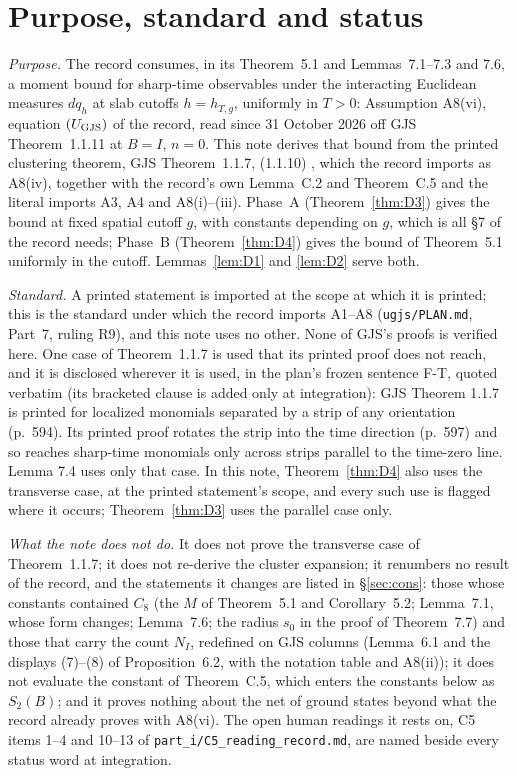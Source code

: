 \section{Purpose, standard and status}\label{sec:purpose}

\emph{Purpose.} The record \cite{R} consumes, in its Theorem~5.1 and Lemmas~7.1--7.3 and 7.6,
a moment bound for sharp-time observables under the interacting Euclidean measures $dq_h$ at
slab cutoffs $h=h_{T,g}$, uniformly in $T>0$: Assumption A8(vi), equation $(U_{\rm GJS})$ of the
record, read since 31 October 2026 off GJS Theorem~1.1.11 at $B=I$, $n=0$. This note derives
that bound from the printed clustering theorem, GJS Theorem~1.1.7, (1.1.10)
\cite[p.~594]{GJS}, which the record imports as A8(iv), together with the record's own
Lemma~C.2 and Theorem~C.5 and the literal imports A3, A4 and A8(i)--(iii). Phase~A
(Theorem~\ref{thm:D3}) gives the bound at fixed spatial cutoff $g$, with constants depending on
$g$, which is all \S7 of the record needs; Phase~B (Theorem~\ref{thm:D4}) gives the bound of
Theorem~5.1 uniformly in the cutoff. Lemmas~\ref{lem:D1} and \ref{lem:D2} serve both.

\emph{Standard.} A printed statement is imported at the scope at which it is printed; this is
the standard under which the record imports A1--A8 (\texttt{ugjs/PLAN.md}, Part~7, ruling R9),
and this note uses no other. None of GJS's proofs is verified here. One case of
Theorem~1.1.7 is used that its printed proof does not reach, and it is disclosed wherever it
is used, in the plan's frozen sentence F-T, quoted verbatim (its bracketed clause is added only at
integration): GJS Theorem 1.1.7 is printed for localized monomials separated by a strip of any
orientation (p.~594). Its printed proof rotates the strip into the time direction (p.~597) and
so reaches sharp-time monomials only across strips parallel to the time-zero line. Lemma 7.4
uses only that case. In this note, Theorem~\ref{thm:D4} also uses the transverse case, at the
printed statement's scope, and every such use is flagged where it occurs;
Theorem~\ref{thm:D3} uses the parallel case only.

\emph{What the note does not do.} It does not prove the transverse case of Theorem~1.1.7; it
does not re-derive the cluster expansion; it renumbers no result of the record, and the
statements it changes are listed in \S\ref{sec:cons}: those whose constants contained $C_8$
(the $M$ of Theorem~5.1 and Corollary~5.2; Lemma~7.1, whose form changes; Lemma~7.6; the
radius $s_0$ in the proof of Theorem~7.7) and those that carry the count $N_I$, redefined on
GJS columns (Lemma~6.1 and the displays (7)--(8) of Proposition~6.2, with the notation table
and A8(ii)); it does not evaluate the constant of Theorem~C.5, which enters the constants below as $S_2(B)$; and it
proves nothing about the net of ground states beyond what the record already proves with
A8(vi). The open human readings it rests on, C5 items 1--4 and 10--13 of
\texttt{part\_i/C5\_reading\_record.md}, are named beside every status word at integration.

